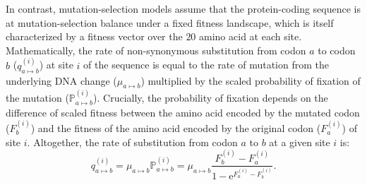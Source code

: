 \documentclass{article}
\newcommand{\e}{\mathrm{e}}
\newcommand{\proba}{\mathbb{P}}
\begin{document}
    In contrast, mutation-selection models assume that the protein-coding sequence is at mutation-selection balance under a fixed fitness landscape, which is itself characterized by a fitness vector over the $20$ amino acid at each site\cite{yang_mutationselection_2008, halpern_evolutionary_1998, rodrigue_mechanistic_2010}.
    Mathematically, the rate of non-synonymous substitution from codon $a$ to codon $b$ ($q_{a \mapsto b}^{(i)}$) at site $i$ of the sequence is equal to the rate of mutation from the underlying DNA change ($\mu_{a \mapsto b}$) multiplied by the scaled probability of fixation of the mutation ($\proba_{a \mapsto b}^{(i)}$).
    Crucially, the probability of fixation depends on the difference of scaled fitness between the amino acid encoded by the mutated codon ($F_b^{(i)}$) and the fitness of the amino acid encoded by the original codon ($F_a^{(i)}$) of site $i$\cite{wright_evolution_1931, fisher_genetical_1930}.
    Altogether, the rate of substitution from codon $a$ to $b$ at a given site $i$ is:
    \begin{equation}
        q_{a \mapsto b}^{(i)} = \mu_{a \mapsto b} \proba_{a \mapsto b}^{(i)} = \mu_{a \mapsto b} \dfrac{F_b^{(i)} - F_a^{(i)}}{1 - \e^{F_a^{(i)} - F_b^{(i)}}}.
    \end{equation}
\end{document}
